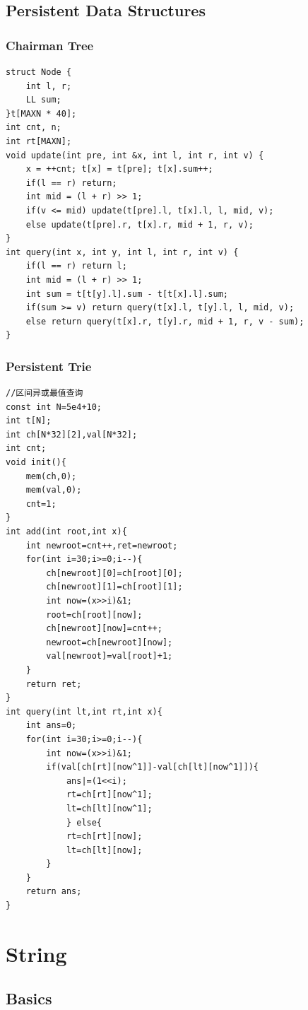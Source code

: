 \documentclass[10pt]{ctexart}
\begin{document}
{\subsection{Persistent Data Structures}
\subsubsection{Chairman Tree}
\begin{lstlisting}
struct Node {
    int l, r;
    LL sum;
}t[MAXN * 40];
int cnt, n;
int rt[MAXN];
void update(int pre, int &x, int l, int r, int v) {
    x = ++cnt; t[x] = t[pre]; t[x].sum++;
    if(l == r) return;
    int mid = (l + r) >> 1;
    if(v <= mid) update(t[pre].l, t[x].l, l, mid, v);
    else update(t[pre].r, t[x].r, mid + 1, r, v);
}
int query(int x, int y, int l, int r, int v) {
    if(l == r) return l;
    int mid = (l + r) >> 1;
    int sum = t[t[y].l].sum - t[t[x].l].sum;
    if(sum >= v) return query(t[x].l, t[y].l, l, mid, v);
    else return query(t[x].r, t[y].r, mid + 1, r, v - sum);
}
\end{lstlisting}
\subsubsection{Persistent Trie}
\begin{lstlisting}
//区间异或最值查询
const int N=5e4+10;
int t[N];
int ch[N*32][2],val[N*32];
int cnt;
void init(){
    mem(ch,0);
    mem(val,0);
    cnt=1;
}
int add(int root,int x){
    int newroot=cnt++,ret=newroot;
    for(int i=30;i>=0;i--){
        ch[newroot][0]=ch[root][0];
        ch[newroot][1]=ch[root][1];
        int now=(x>>i)&1;
        root=ch[root][now];
        ch[newroot][now]=cnt++;
        newroot=ch[newroot][now];
        val[newroot]=val[root]+1;
    }
    return ret;
}
int query(int lt,int rt,int x){
    int ans=0;
    for(int i=30;i>=0;i--){
        int now=(x>>i)&1;
        if(val[ch[rt][now^1]]-val[ch[lt][now^1]]){
            ans|=(1<<i);
            rt=ch[rt][now^1];
            lt=ch[lt][now^1];
            } else{
            rt=ch[rt][now];
            lt=ch[lt][now];
        }
    }
    return ans;
}
\end{lstlisting}





\newpage
\section{String}
\subsection{Basics}
}
\end{document}
